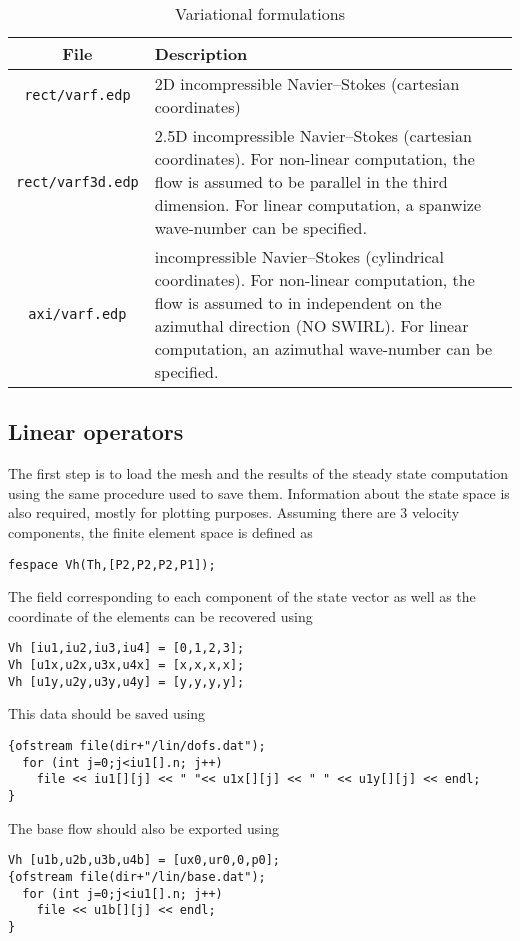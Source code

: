 \documentclass[12pts]{article}%
\begin{document}
\begin{table}
\begin{center}
\begin{tabular}{c|p{10cm}}
  File & Description \\ \hline \hline
  \texttt{rect/varf.edp}   & 2D incompressible Navier--Stokes (cartesian coordinates) \\
  \texttt{rect/varf3d.edp} & 2.5D incompressible Navier--Stokes (cartesian coordinates). For non-linear computation, the flow is assumed to be parallel in the third dimension. For linear computation, a spanwize wave-number can be specified. \\
  \texttt{axi/varf.edp} & incompressible Navier--Stokes (cylindrical coordinates). For non-linear computation, the flow is assumed to in independent on the azimuthal direction (NO SWIRL). For linear computation, an azimuthal  wave-number can be specified.
\end{tabular}
\caption{Variational formulations}\label{tab:varf}
\end{center}
\end{table}

\subsection{Linear operators}

The first step is to load the mesh and the results of the steady state
computation using the same procedure used to save them.  Information
about the state space is also required, mostly for plotting
purposes. Assuming there are 3 velocity components, the finite element
space is defined as
\begin{verbatim}
fespace Vh(Th,[P2,P2,P2,P1]);
\end{verbatim}
The field corresponding to each component of the state vector as well
as the coordinate of the elements can be recovered using
\begin{verbatim}
Vh [iu1,iu2,iu3,iu4] = [0,1,2,3];
Vh [u1x,u2x,u3x,u4x] = [x,x,x,x];
Vh [u1y,u2y,u3y,u4y] = [y,y,y,y];
\end{verbatim}
This data should be saved using
\begin{verbatim}
{ofstream file(dir+"/lin/dofs.dat");
  for (int j=0;j<iu1[].n; j++)
    file << iu1[][j] << " "<< u1x[][j] << " " << u1y[][j] << endl;
}
\end{verbatim}
The base flow should also be exported using
\begin{verbatim}
Vh [u1b,u2b,u3b,u4b] = [ux0,ur0,0,p0];
{ofstream file(dir+"/lin/base.dat");
  for (int j=0;j<iu1[].n; j++)
    file << u1b[][j] << endl;
}
\end{verbatim}
\end{document}
